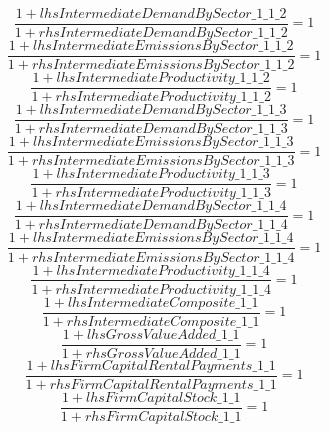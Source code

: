\begin{dmath}
\frac{1+{lhsIntermediateDemandBySector\_1\_1\_2}}{1+{rhsIntermediateDemandBySector\_1\_1\_2}}=1
\end{dmath}
\begin{dmath}
\frac{1+{lhsIntermediateEmissionsBySector\_1\_1\_2}}{1+{rhsIntermediateEmissionsBySector\_1\_1\_2}}=1
\end{dmath}
\begin{dmath}
\frac{1+{lhsIntermediateProductivity\_1\_1\_2}}{1+{rhsIntermediateProductivity\_1\_1\_2}}=1
\end{dmath}
\begin{dmath}
\frac{1+{lhsIntermediateDemandBySector\_1\_1\_3}}{1+{rhsIntermediateDemandBySector\_1\_1\_3}}=1
\end{dmath}
\begin{dmath}
\frac{1+{lhsIntermediateEmissionsBySector\_1\_1\_3}}{1+{rhsIntermediateEmissionsBySector\_1\_1\_3}}=1
\end{dmath}
\begin{dmath}
\frac{1+{lhsIntermediateProductivity\_1\_1\_3}}{1+{rhsIntermediateProductivity\_1\_1\_3}}=1
\end{dmath}
\begin{dmath}
\frac{1+{lhsIntermediateDemandBySector\_1\_1\_4}}{1+{rhsIntermediateDemandBySector\_1\_1\_4}}=1
\end{dmath}
\begin{dmath}
\frac{1+{lhsIntermediateEmissionsBySector\_1\_1\_4}}{1+{rhsIntermediateEmissionsBySector\_1\_1\_4}}=1
\end{dmath}
\begin{dmath}
\frac{1+{lhsIntermediateProductivity\_1\_1\_4}}{1+{rhsIntermediateProductivity\_1\_1\_4}}=1
\end{dmath}
\begin{dmath}
\frac{1+{lhsIntermediateComposite\_1\_1}}{1+{rhsIntermediateComposite\_1\_1}}=1
\end{dmath}
\begin{dmath}
\frac{1+{lhsGrossValueAdded\_1\_1}}{1+{rhsGrossValueAdded\_1\_1}}=1
\end{dmath}
\begin{dmath}
\frac{1+{lhsFirmCapitalRentalPayments\_1\_1}}{1+{rhsFirmCapitalRentalPayments\_1\_1}}=1
\end{dmath}
\begin{dmath}
\frac{1+{lhsFirmCapitalStock\_1\_1}}{1+{rhsFirmCapitalStock\_1\_1}}=1
\end{dmath}
